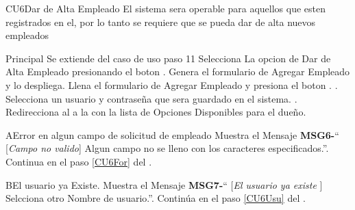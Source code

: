 \begin{UseCase}{CU6}{Dar de Alta Empleado}{ 
		El sistema sera operable para aquellos que esten registrados en el, por lo tanto se requiere que se pueda dar de alta nuevos empleados
	}
	\end{UseCase}
	\begin{UCtrayectoria}{Principal}
		\UCpaso Se extiende del caso de uso  paso 11
		\UCpaso[\UCactor] Selecciona La opcion de Dar de Alta Empleado presionando el boton .
		\UCpaso Genera el formulario de Agregar Empleado y lo despliega.
		\UCpaso[\UCactor] Llena el formulario de Agregar Empleado y presiona el boton .  \label{CU6For}.
		\UCpaso[\UCactor] Selecciona un usuario y contraseña que sera guardado en el sistema. \label{CU6Usu}.
		\UCpaso Redirecciona al \UCactor a la   con la lista de Opciones Disponibles para el dueño.
	\end{UCtrayectoria}


		 \begin{UCtrayectoriaA}{A}{Error en algun campo de solicitud de empleado}
			\UCpaso Muestra el Mensaje {\bf MSG6-}`` [{\em Campo no valido}] Algun campo no se lleno con los caracteres especificados.''.
			\UCpaso Continua en el paso \ref{CU6For} del .
		\end{UCtrayectoriaA}

		\begin{UCtrayectoriaA}{B}{El usuario ya Existe.}
			\UCpaso Muestra el Mensaje {\bf MSG7-}`` [{\em El usuario ya existe }] Selcciona otro Nombre de usuario.''.
			\UCpaso Continúa en el paso \ref{CU6Usu} del .
		\end{UCtrayectoriaA}



